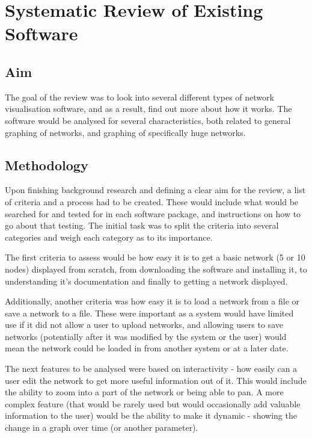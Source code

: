 \documentclass[../dissertation.tex]{subfiles}
\begin{document}
\chapter{Systematic Review of Existing Software}
\label{sec:systematic-review}

\section{Aim} 

The goal of the review was to look into several different types of network visualisation software, and as a result, find out more about how it works. The software would be analysed for several characteristics, both related to general graphing of networks, and graphing of specifically huge networks.

\section{Methodology}

Upon finishing background research and defining a clear aim for the review, a list of criteria and a process had to be created. These would include what would be searched for and tested for in each software package, and instructions on how to go about that testing. The initial task was to split the criteria into several categories and weigh each category as to its importance. 

The first criteria to assess would be how easy it is to get a basic network (5 or 10 nodes) displayed from scratch, from downloading the software and installing it, to understanding it's documentation and finally to getting a network displayed.

Additionally, another criteria was how easy it is to load a network from a file or save a network to a file. These were important as a system would have limited use if it did not allow a user to upload networks, and allowing users to save networks (potentially after it was modified by the system or the user) would mean the network could be loaded in from another system or at a later date. 

The next features to be analysed were based on interactivity - how easily can a user edit the network to get more useful information out of it. This would include the ability to zoom into a part of the network or being able to pan. A more complex feature (that would be rarely used but would occasionally add valuable information to the user) would be the ability to make it dynamic - showing the change in a graph over time (or another parameter). 
\end{document}
